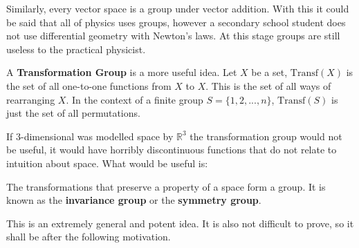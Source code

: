 \documentclass[twocolumn,floatfix,aps,prd,amsmath,amssymb]{revtex4}
\begin{document}
Similarly, every vector space is a group under vector addition. With this it could be said that all of physics uses groups, however a secondary school student does not use differential geometry with Newton's laws. At this stage groups are still useless to the practical physicist.

A \textbf{Transformation Group} is a more useful idea. Let $X$ be a set, $\mathrm{Transf}(X)$ is the set of all one-to-one functions from $X$ to $X$. This is the set of all ways of rearranging $X$. In the context of a finite group $S=\{1,2,...,n\}$, $\mathrm{Transf}(S)$ is just the set of all permutations. 

If $3$-dimensional was modelled space by $\mathbb{R}^3$ the transformation group would not be useful, it would have horribly discontinuous functions that do not relate to intuition about space. What would be useful is:
\begin{center}
The transformations that preserve a property of a space form a group. It is known as the \textbf{invariance group} or the \textbf{symmetry group}.
\end{center}
 This is an extremely general and potent idea. It is also not difficult to prove, so it shall be after the following motivation.
 
\end{document}
